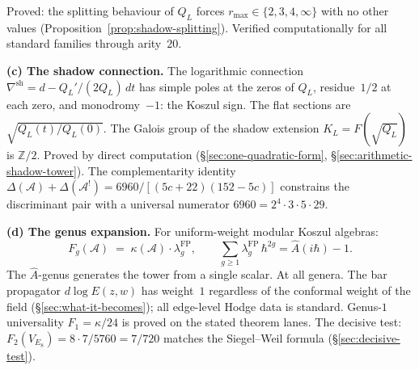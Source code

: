 \documentclass[11pt]{article}
\newcommand{\cA}{\mathcal{A}}
\newcommand{\Z}{\mathbb{Z}}
\begin{document}
\noindent
Proved: the splitting behaviour of $Q_L$ forces
$r_{\max} \in \{2, 3, 4, \infty\}$ with no other values
(Proposition~\ref{prop:shadow-splitting}).  Verified
computationally for all standard families through arity~$20$.

\medskip

\noindent\textbf{(c) The shadow connection.}\enspace
The logarithmic connection
$\nabla^{\mathrm{sh}} = d - Q_L'/(2Q_L)\,dt$ has simple poles
at the zeros of $Q_L$, residue~$1/2$ at each zero, and
monodromy~$-1$: the Koszul sign.  The flat sections are
$\sqrt{Q_L(t)/Q_L(0)}$.  The Galois group of the shadow
extension $K_L = F(\sqrt{Q_L})$ is $\Z/2$.  Proved by direct
computation (\S\ref{sec:one-quadratic-form},
\S\ref{sec:arithmetic-shadow-tower}).  The complementarity
identity
$\Delta(\cA) + \Delta(\cA^!) = 6960/[(5c{+}22)(152{-}5c)]$
constrains the discriminant pair with a universal numerator
$6960 = 2^4 \cdot 3 \cdot 5 \cdot 29$.

\medskip

\noindent\textbf{(d) The genus expansion.}\enspace
For uniform-weight modular Koszul algebras:
\begin{equation}\label{eq:genus-expansion-summary}
F_g(\cA) \;=\; \kappa(\cA) \cdot \lambda_g^{\mathrm{FP}},
\qquad
\sum_{g \geq 1} \lambda_g^{\mathrm{FP}}\, \hbar^{2g}
= \hat{A}(i\hbar) - 1.
\end{equation}
The $\hat{A}$-genus generates the tower from a single scalar.
At all genera.  The bar propagator $d\log E(z,w)$ has
weight~$1$ regardless of the conformal weight of the field
(\S\ref{sec:what-it-becomes}); all edge-level Hodge data is
standard.  Genus-$1$ universality $F_1 = \kappa/24$ is proved
on the stated theorem lanes.  The decisive test:
$F_2(V_{E_8}) = 8\cdot 7/5760 = 7/720$ matches the Siegel--Weil formula
(\S\ref{sec:decisive-test}).

\medskip
\end{document}
